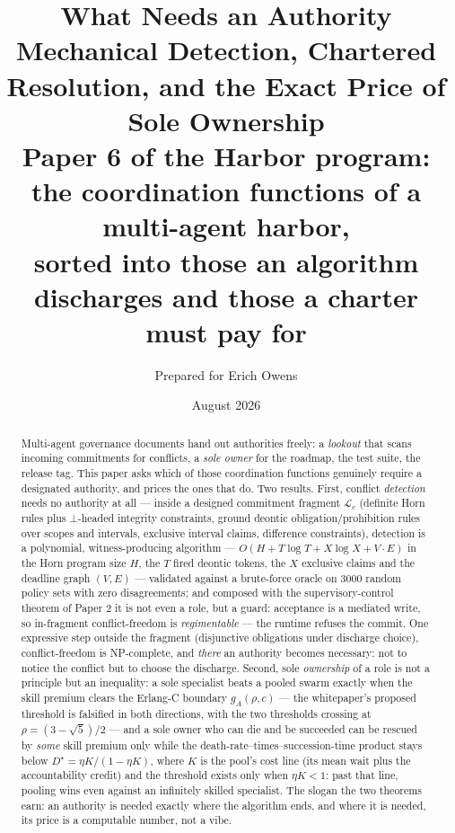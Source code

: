 \documentclass[11pt,a4paper]{article}
\title{\textbf{What Needs an Authority}\\[4pt]
\large Mechanical Detection, Chartered Resolution, and the Exact Price of Sole Ownership\\[3pt]
\normalsize Paper 6 of the Harbor program: the coordination functions of a multi-agent harbor,\\
sorted into those an algorithm discharges and those a charter must pay for}
\author{Prepared for Erich Owens}
\date{August 2026}
\begin{document}
\maketitle

\begin{abstract}
\noindent Multi-agent governance documents hand out authorities freely: a \emph{lookout} that scans incoming commitments for
conflicts, a \emph{sole owner} for the roadmap, the test suite, the release tag. This paper asks which of those coordination
functions genuinely require a designated authority, and prices the ones that do. Two results. First, conflict \emph{detection} needs
no authority at all --- inside a designed commitment fragment $\mathcal{L}_c$ (definite Horn rules plus $\bot$-headed integrity
constraints, ground deontic obligation/prohibition rules over scopes and intervals, exclusive interval claims, difference
constraints), detection is a polynomial, witness-producing algorithm --- $O(H + T\log T + X\log X + V\!\cdot\!E)$ in the Horn
program size $H$, the $T$ fired deontic tokens, the $X$ exclusive claims and the deadline graph $(V,E)$ --- validated against a
brute-force oracle on 3000 random policy sets with zero disagreements; and composed with the supervisory-control theorem of Paper 2 it is not even a role, but
a guard: acceptance is a mediated write, so in-fragment conflict-freedom is \emph{regimentable} --- the runtime refuses the commit.
One expressive step outside the fragment (disjunctive obligations under discharge choice), conflict-freedom is NP-complete, and
\emph{there} an authority becomes necessary: not to notice the conflict but to choose the discharge. Second, sole \emph{ownership}
of a role is not a principle but an inequality: a sole specialist beats a pooled swarm exactly when the skill premium clears the
Erlang-C boundary $g_A(\rho,c)$ --- the whitepaper's proposed threshold is falsified in both directions, with the two thresholds
crossing at $\rho=(3-\sqrt5)/2$ --- and a sole owner who can die and be succeeded can be rescued by \emph{some} skill premium only
while the death-rate--times--succession-time product stays below $D^\star=\eta K/(1-\eta K)$, where $K$ is the pool's cost line (its
mean wait plus the accountability credit) and the threshold exists only when $\eta K<1$: past that line, pooling wins even against an
infinitely skilled specialist. The slogan the two theorems earn: an authority is needed exactly where the algorithm ends, and where
it is needed, its price is a computable number, not a vibe.
\end{abstract}
\end{document}
